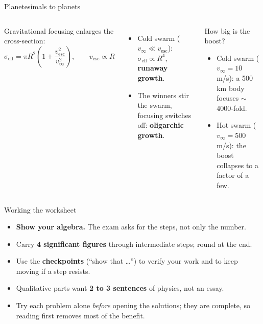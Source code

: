 \documentclass[aspectratio=169, 11pt]{beamer}
\begin{document}
\begin{frame}{Planetesimals to planets}
  \begin{columns}[T]
    Gravitational focusing enlarges the cross-section:
    \[
      \sigma_{\mathrm{eff}} = \pi R^2 \left(1 + \frac{v_{\mathrm{esc}}^2}{v_\infty^2}\right),
      \qquad v_{\mathrm{esc}} \propto R
    \]
    \begin{itemize}\setlength\itemsep{1pt}
      \item Cold swarm ($v_\infty \ll v_{\mathrm{esc}}$): $\sigma_{\mathrm{eff}} \propto R^4$, \textbf{runaway growth}.
      \item The winners stir the swarm, focusing switches off: \textbf{oligarchic growth}.
    \end{itemize}

    \begin{block}{How big is the boost?}
      \begin{itemize}\setlength\itemsep{1pt}
        \item Cold swarm ($v_\infty = 10$ m/s): a 500 km body focuses $\sim$4000-fold.
        \item Hot swarm ($v_\infty = 500$ m/s): the boost collapses to a factor of a few.
      \end{itemize}
    \end{block}
  \end{columns}
  \vskip0pt\relax
\end{frame}

\begin{frame}{Working the worksheet}
  \begin{itemize}
    \item \textbf{Show your algebra.} The exam asks for the steps, not only the number.
    \item Carry \textbf{4 significant figures} through intermediate steps; round at the end.
    \item Use the \textbf{checkpoints} (``show that \ldots'') to verify your work and to keep moving if a step resists.
    \item Qualitative parts want \textbf{2 to 3 sentences} of physics, not an essay.
    \item Try each problem alone \emph{before} opening the solutions; they are complete, so reading first removes most of the benefit.
  \end{itemize}
  \vskip8pt\relax
\end{frame}
\end{document}
